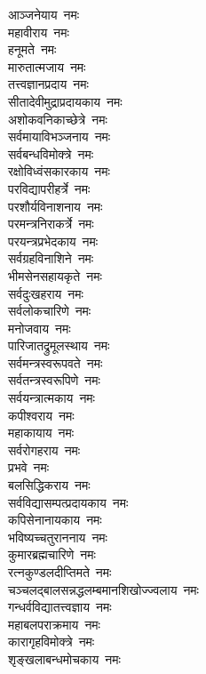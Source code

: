\begin{multicols}{2}
\begin{flushleft}
आञ्जनेयाय~नमः\\
महावीराय~नमः\\
हनूमते~नमः\\
मारुतात्मजाय~नमः\\
तत्त्वज्ञानप्रदाय~नमः\\
सीतादेवीमुद्राप्रदायकाय~नमः\\
अशोकवनिकाच्छेत्रे~नमः\\
सर्वमायाविभञ्जनाय~नमः\\
सर्वबन्धविमोक्त्रे~नमः\\
रक्षोविध्वंसकारकाय~नमः\hfill{}\\
परविद्यापरीहर्त्रे~नमः\\
परशौर्यविनाशनाय~नमः\\
परमन्त्रनिराकर्त्रे~नमः\\
परयन्त्रप्रभेदकाय~नमः\\
सर्वग्रहविनाशिने~नमः\\
भीमसेनसहायकृते~नमः\\
सर्वदुःखहराय~नमः\\
सर्वलोकचारिणे~नमः\\
मनोजवाय~नमः\\
पारिजातद्रुमूलस्थाय~नमः\hfill{}\\
सर्वमन्त्रस्वरूपवते~नमः\\
सर्वतन्त्रस्वरूपिणे~नमः\\
सर्वयन्त्रात्मकाय~नमः\\
कपीश्वराय~नमः\\
महाकायाय~नमः\\
सर्वरोगहराय~नमः\\
प्रभवे~नमः\\
बलसिद्धिकराय~नमः\\
सर्वविद्यासम्पत्प्रदायकाय~नमः\\
कपिसेनानायकाय~नमः\hfill{}\\
भविष्यच्चतुराननाय~नमः\\
कुमारब्रह्मचारिणे~नमः\\
रत्नकुण्डलदीप्तिमते~नमः\\
चञ्चलद्बालसन्नद्ध\-लम्बमानशिखोज्ज्वलाय~नमः\\
गन्धर्वविद्यातत्त्वज्ञाय~नमः\\
महाबलपराक्रमाय~नमः\\
कारागृहविमोक्त्रे~नमः\\
शृङ्खलाबन्धमोचकाय~नमः\\

\end{flushleft}
\end{multicols}
